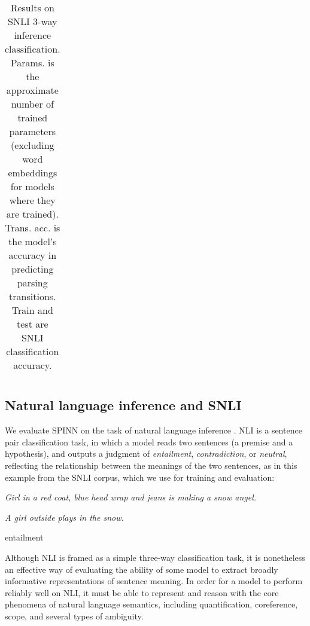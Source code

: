 \documentclass[11pt]{article}
\begin{document}
\begin{table*}[t]
\begin{tabular}{lrrrr}
    \bottomrule
  \end{tabular}
\caption{\protect\label{tab:results}Results on SNLI 3-way inference classification. Params. is the approximate number of trained parameters (excluding word embeddings for models where they are trained). Trans. acc. is the model's accuracy in predicting parsing transitions. Train and test are SNLI classification accuracy.} 
\end{table*}


\subsection{Natural language inference and SNLI}

We evaluate SPINN on the task of natural language inference \citep[NLI, also known as recognizing textual entailment, or RTE;][]{dagan2006pascal,MacCartney09}. NLI is a sentence pair classification task, in which a model reads two sentences (a premise and a hypothesis), and outputs a judgment of {\it entailment}, {\it contradiction}, or {\it neutral}, reflecting the relationship between the meanings of the two sentences, as in this example from the SNLI corpus, which we use for training and evaluation: 

\begin{description}\small 
\item[\bf Premise:] {\it Girl in a red coat, blue head wrap and jeans is making a snow angel.}
\item[\bf Hypothesis:] {\it A girl outside plays in the snow.}
\item[\bf Correct label:] entailment
\end{description}

Although NLI is framed as a simple three-way classification task, it is nonetheless an effective way of evaluating the ability of some model to extract broadly informative representations of sentence meaning. In order for a model to perform reliably well on NLI, it must be able to represent and reason with the core phenomena of natural language semantics, including quantification, coreference, scope, and several types of ambiguity.
\end{document}
